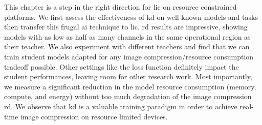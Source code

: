 This chapter is a step in the right direction for \acrshort{lic} on resource constrained platforms. We first assess the effectiveness of \acrshort{kd} on well known models and tasks then transfer this frugal \acrshort{ai} technique to \acrshort{lic}. \acrshort{rd} results are impressive, showing models with as low as half as many channels in the same operational region as their teacher. We also experiment with different teachers and find that we can train student models adapted for any image compression/resource consumption tradeoff possible. Other settings like the loss function definitely impact the student performances, leaving room for other research work. Most importantly, we measure a significant reduction in the model resource consumption (memory, compute, and energy) without too much degradation of the image compression \acrshort{rd}. We observe that \acrshort{kd} is a valuable training paradigm in order to achieve real-time image compression on resource limited devices.
